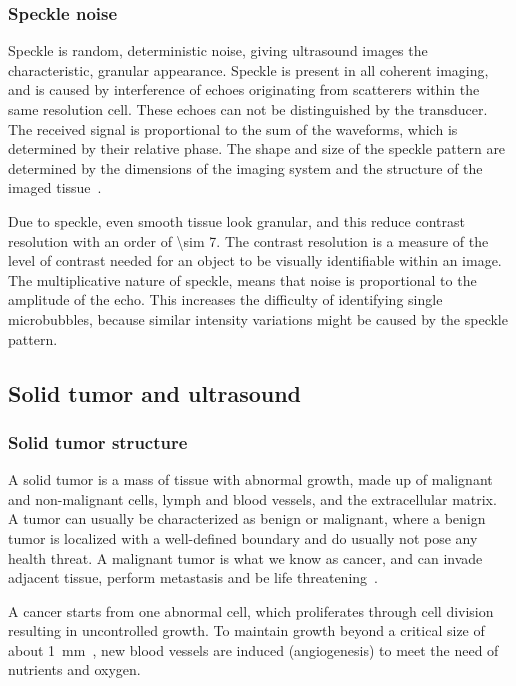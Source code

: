 \subsubsection{Speckle noise}
Speckle is random, deterministic noise, giving ultrasound images the characteristic, granular appearance. Speckle is present in all coherent imaging, and is caused by interference of echoes originating from scatterers within the same resolution cell. These echoes can not be distinguished by the transducer. The received signal is proportional to the sum of the waveforms, which is determined by their relative phase. The shape and size of the speckle pattern are determined by the dimensions of the imaging system and the structure of the imaged tissue~\cite{Szabo2013}.

Due to speckle, even smooth tissue look granular, and this reduce contrast resolution with an order of \num{\sim 7}. The contrast resolution is a measure of the level of contrast needed for an object to be visually identifiable within an image. The multiplicative nature of speckle, means that noise is proportional to the amplitude of the echo. This increases the difficulty of identifying single microbubbles, because similar intensity variations might be caused by the speckle pattern. 

\clearpage
\subsection{Solid tumor and ultrasound}
\subsubsection{Solid tumor structure}

 A solid tumor is a mass of tissue with abnormal growth, made up of malignant and non-malignant cells, lymph and blood vessels, and the extracellular matrix. A tumor can usually be characterized as benign or malignant, where a benign tumor is localized with a well-defined boundary and do usually not pose any health threat. A malignant tumor is what we know as cancer, and can invade adjacent tissue, perform metastasis and be life threatening~\cite{king2006cancer}. 

A cancer starts from one abnormal cell, which proliferates through cell division resulting in uncontrolled growth. To maintain growth beyond a critical size of about \SI{1}{\milli\metre}~\cite{king2006cancer}, new blood vessels are induced (angiogenesis) to meet the need of nutrients and oxygen. 

